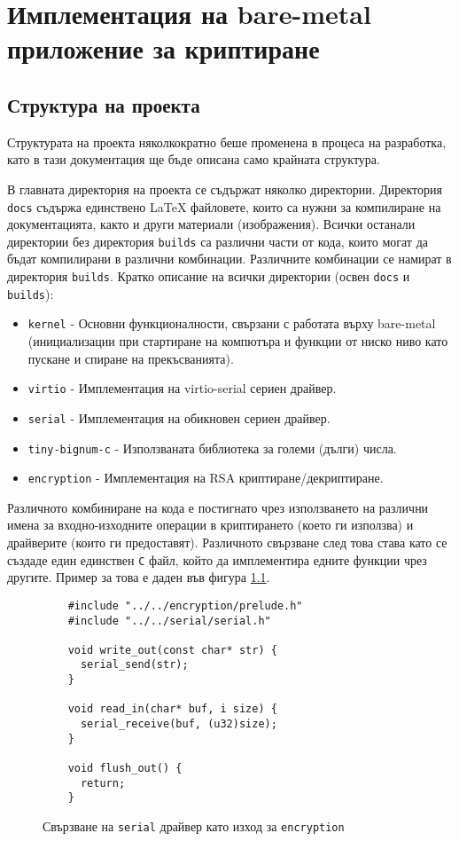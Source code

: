\chapter{Имплементация на bare-metal приложение за криптиране} %
\section{Структура на проекта}
Структурата на проекта няколкократно беше променена в процеса на разработка, като в тази документация ще бъде описана само крайната структура.

В главната директория на проекта се съдържат няколко директории. Директория {\tt docs} съдържа единствено \LaTeX{} файловете, които са нужни за компилиране на документацията, както и други материали (изображения). Всички останали директории без директория {\tt builds} са различни части от кода, които могат да бъдат компилирани в различни комбинации. Различните комбинации се намират в директория {\tt builds}. Кратко описание на всички директории (освен {\tt docs} и {\tt builds}):
\begin{itemize}
  \item {\tt kernel} - Основни функционалности, свързани с работата върху bare-metal (инициализации при стартиране на компютъра и функции от ниско ниво като пускане и спиране на прекъсванията).
  \item {\tt virtio} - Имплементация на virtio-serial сериен драйвер.
  \item {\tt serial} - Имплементация на обикновен сериен драйвер.
  \item {\tt tiny-bignum-c} - Използваната библиотека за големи (дълги) числа.
  \item {\tt encryption} - Имплементация на RSA криптиране/декриптиране.
\end{itemize}

Различното комбиниране на кода е постигнато чрез използването на различни имена за входно-изходните операции в криптирането (което ги използва) и драйверите (които ги предоставят). Различното свързване след това става като се създаде един единствен {\tt C} файл, който да имплементира едните функции чрез другите. Пример за това е даден във фигура \ref{fig:io-file-example}.
\begin{figure}[htpb]
  \centering
  \caption{Свързване на {\tt serial} драйвер като изход за {\tt encryption}}
  \begin{verbatim}
    #include "../../encryption/prelude.h"
    #include "../../serial/serial.h"

    void write_out(const char* str) {
      serial_send(str);
    }

    void read_in(char* buf, i size) {
      serial_receive(buf, (u32)size);
    }

    void flush_out() {
      return;
    }
  \end{verbatim}
  \label{fig:io-file-example}
\end{figure}

